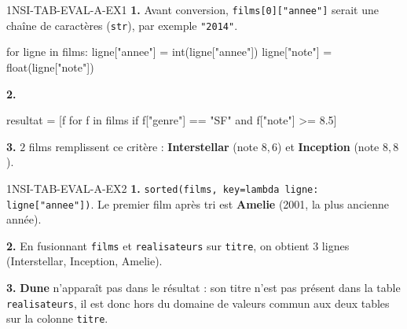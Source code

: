 \begin{corrige}{1NSI-TAB-EVAL-A-EX1}
\textbf{1.} Avant conversion, \lstinline{films[0]["annee"]} serait une chaîne de
caractères (\lstinline{str}), par exemple \lstinline{"2014"}.
\begin{python}
for ligne in films:
    ligne["annee"] = int(ligne["annee"])
    ligne["note"] = float(ligne["note"])
\end{python}

\textbf{2.}
\begin{python}
resultat = [f for f in films if f["genre"] == "SF" and f["note"] >= 8.5]
\end{python}

\textbf{3.} $2$ films remplissent ce critère : \textbf{Interstellar} (note $8{,}6$) et
\textbf{Inception} (note $8{,}8$).
\end{corrige}

\begin{corrige}{1NSI-TAB-EVAL-A-EX2}
\textbf{1.} \lstinline{sorted(films, key=lambda ligne: ligne["annee"])}. Le premier film
après tri est \textbf{Amelie} (2001, la plus ancienne année).

\textbf{2.} En fusionnant \lstinline{films} et \lstinline{realisateurs} sur
\lstinline{titre}, on obtient $3$ lignes (Interstellar, Inception, Amelie).

\textbf{3.} \textbf{Dune} n'apparaît pas dans le résultat : son titre n'est pas présent
dans la table \lstinline{realisateurs}, il est donc hors du domaine de valeurs commun aux
deux tables sur la colonne \lstinline{titre}.
\end{corrige}
